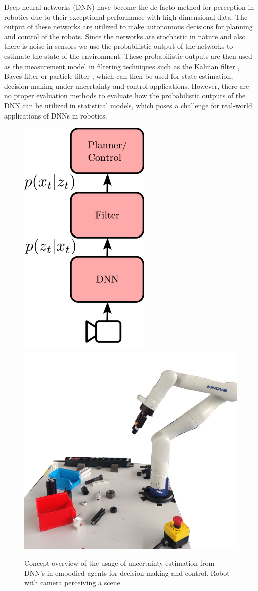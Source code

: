 Deep neural networks (DNN) have become the de-facto method for perception in robotics due to their exceptional performance with high dimensional data. The output of these networks are utilized to make autonomous decisions for planning and control of the robots. Since the networks are stochastic in nature and also there is noise in sensors we use the probabilistic output of the networks to estimate the state of the environment. These probabilistic outputs are then used as the measurement model in filtering techniques such as the Kalman filter \cite{9746732} \cite{revach2022kalmannet}, Bayes filter \cite{pankert2021deep} or particle filter \cite{karkus2018particle}, which can then be used for state estimation, decision-making under uncertainty and control applications. However, there are no proper evaluation methods to evaluate how the probabilistic outputs of the DNN can be utilized in statistical models, which poses a challenge for real-world applications of DNNs in robotics.
\begin{figure}[t]
	\centering
	\includegraphics[width=0.25\linewidth]{images/overview}
	\includegraphics[width=0.60\linewidth]{images/robot_v11}
	\caption[Overview of usage of uncertainty estimation]{Concept overview of the usage of uncertainty estimation from DNN's in embodied agents for decision making and control. 
	Robot with camera perceiving a scene.}
	\label{fig:overview}
\end{figure}

